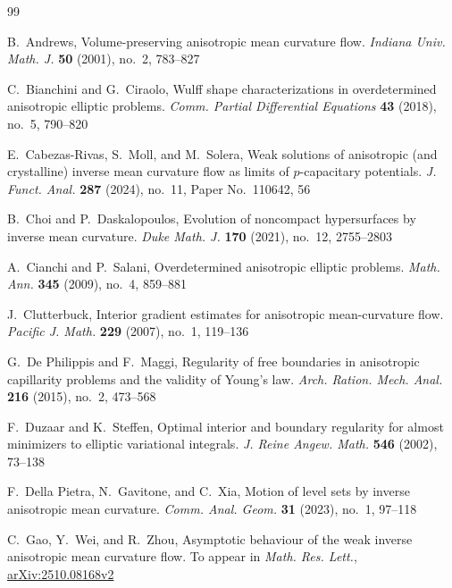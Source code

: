 \documentclass[11pt,reqno]{amsart}
\providecommand{\arxiv}[1]{\href{https://arxiv.org/abs/#1}{arXiv:#1}}
\theoremstyle{definition}
\theoremstyle{remark}
\numberwithin{equation}{section}
\begin{document}
\begin{thebibliography}{99}

B.~Andrews, Volume-preserving anisotropic mean curvature flow.
\emph{Indiana Univ. Math. J.} \textbf{50} (2001), no.~2, 783--827


C.~Bianchini and G.~Ciraolo, Wulff shape characterizations in overdetermined anisotropic elliptic problems.
\emph{Comm. Partial Differential Equations} \textbf{43} (2018), no.~5, 790--820

E.~Cabezas-Rivas, S.~Moll, and M.~Solera, Weak solutions of anisotropic (and crystalline) inverse mean curvature flow as limits of $p$-capacitary potentials.
\emph{J. Funct. Anal.} \textbf{287} (2024), no.~11, Paper No.~110642, 56

B.~Choi and P.~Daskalopoulos, Evolution of noncompact hypersurfaces by inverse mean curvature.
\emph{Duke Math. J.} \textbf{170} (2021), no.~12, 2755--2803

A.~Cianchi and P.~Salani, Overdetermined anisotropic elliptic problems.
\emph{Math. Ann.} \textbf{345} (2009), no.~4, 859--881

J.~Clutterbuck, Interior gradient estimates for anisotropic mean-curvature flow.
\emph{Pacific J. Math.} \textbf{229} (2007), no.~1, 119--136

G.~De Philippis and F.~Maggi, Regularity of free boundaries in anisotropic capillarity problems and the validity of Young's law.
\emph{Arch. Ration. Mech. Anal.} \textbf{216} (2015), no.~2, 473--568

F.~Duzaar and K.~Steffen, Optimal interior and boundary regularity for almost minimizers to elliptic variational integrals.
\emph{J. Reine Angew. Math.} \textbf{546} (2002), 73--138

F.~Della Pietra, N.~Gavitone, and C.~Xia, Motion of level sets by inverse anisotropic mean curvature.
\emph{Comm. Anal. Geom.} \textbf{31} (2023), no.~1, 97--118


C.~Gao, Y.~Wei, and R.~Zhou, Asymptotic behaviour of the weak inverse anisotropic mean curvature flow.
To appear in \emph{Math. Res. Lett.}, \arxiv{2510.08168v2}


\end{thebibliography}
\end{document}
